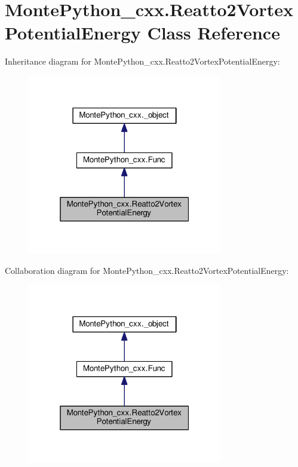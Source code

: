 \hypertarget{classMontePython__cxx_1_1Reatto2VortexPotentialEnergy}{}\section{Monte\+Python\+\_\+cxx.\+Reatto2\+Vortex\+Potential\+Energy Class Reference}
\label{classMontePython__cxx_1_1Reatto2VortexPotentialEnergy}


Inheritance diagram for Monte\+Python\+\_\+cxx.\+Reatto2\+Vortex\+Potential\+Energy\+:
\nopagebreak
\begin{figure}[H]
\begin{center}
\leavevmode
\includegraphics[width=241pt]{classMontePython__cxx_1_1Reatto2VortexPotentialEnergy__inherit__graph}
\end{center}
\end{figure}


Collaboration diagram for Monte\+Python\+\_\+cxx.\+Reatto2\+Vortex\+Potential\+Energy\+:
\nopagebreak
\begin{figure}[H]
\begin{center}
\leavevmode
\includegraphics[width=241pt]{classMontePython__cxx_1_1Reatto2VortexPotentialEnergy__coll__graph}
\end{center}
\end{figure}
